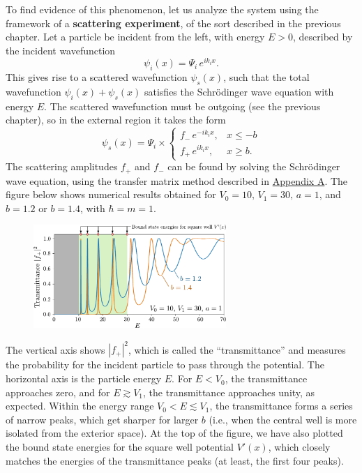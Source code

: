 \documentclass[pra,12pt]{revtex4}
\begin{document}
To find evidence of this phenomenon, let us analyze the system using
the framework of a \textbf{scattering experiment}, of the sort
described in the previous chapter.  Let a particle be incident from
the left, with energy $E > 0$, described by the incident wavefunction
$$\psi_i(x) = \Psi_i \, e^{ik_i x}.$$
This gives rise to a scattered wavefunction $\psi_s(x)$, such that the
total wavefunction $\psi_i(x) + \psi_s(x)$ satisfies the Schr\"odinger
wave equation with energy $E$.  The scattered wavefunction must be
outgoing (see the previous chapter), so in the external region it
takes the form
$$\psi_s(x) = \Psi_i \times \begin{cases}f_- \,e^{-ik_ix}, & x \le -b \\ f_+ \,e^{ik_ix}, & x \ge b.\end{cases}$$
The scattering amplitudes $f_+$ and $f_-$ can be found by solving the
Schr\"odinger wave equation, using the transfer matrix method
described in \hyperref[sec:appendix]{Appendix A}.  The figure below
shows numerical results obtained for $V_0 = 10,\,V_1 = 30,\,a=1$, and
$b = 1.2$ or $b = 1.4$, with $\hbar = m = 1$.

\begin{figure}[h]
  \centering\includegraphics[width=0.65\textwidth]{resonances}
\end{figure}

The vertical axis shows $|f_+|^2$, which is called the
``transmittance'' and measures the probability for the incident
particle to pass through the potential.  The horizontal axis is the
particle energy $E$.  For $E < V_0$, the transmittance approaches
zero, and for $E \gtrsim V_1$, the transmittance approaches unity, as
expected.  Within the energy range $V_0 < E \lesssim V_1$, the
transmittance forms a series of narrow peaks, which get sharper for
larger $b$ (i.e., when the central well is more isolated from the
exterior space).  At the top of the figure, we have also plotted the
bound state energies for the square well potential $V'(x)$, which
closely matches the energies of the transmittance peaks (at least, the
first four peaks).
\end{document}
